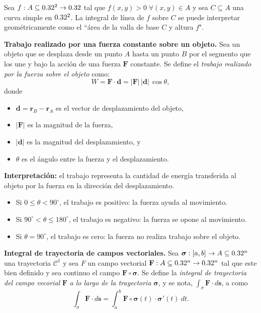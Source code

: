 \begin{obs} 
 Sea $f:A\subseteq0.32^2 \to0.32$   tal que  $f(x,y)>0 \; \forall (x,y) \in A$ y   sea $C  \subseteq  A$  una curva simple en $0.32^2$.   La integral de l\'inea de $f$ sobre $C$  se puede interpretar geom\'etricamente como el ``\'area de la valla de base $C$  y altura $f$". 
\end{obs}


\begin{definition}\textbf{Trabajo realizado por una fuerza constante sobre un objeto.}  
Sea un objeto que se desplaza desde un punto $A$ hasta un punto $B$ por el segmento que los une y  bajo la acci\'on de una fuerza \(\mathbf{F}\) constante. 
Se define el     \emph{trabajo realizado por la fuerza sobre el objeto} como:
\[
W = \mathbf{F} \cdot \mathbf{d} = |\mathbf{F}| \, |\mathbf{d}| \, \cos\theta,
\]
donde
\begin{itemize}
    \item \(\mathbf{d} = \mathbf{r}_B - \mathbf{r}_A\) es el vector de desplazamiento del objeto,
    \item \(|\mathbf{F}|\) es la magnitud de la fuerza,
    \item \(|\mathbf{d}|\) es la magnitud del desplazamiento, y
    \item \(\theta\) es el ángulo entre la fuerza y el desplazamiento.
\end{itemize}
\end{definition}


\textbf{Interpretaci\'on:} el trabajo representa la cantidad de energ\'ia transferida al objeto por la fuerza en la direcci\'on del desplazamiento. 
\begin{itemize}
    \item Si \(0 \leq \theta < 90^\circ\), el trabajo es positivo: la fuerza ayuda al movimiento.
    \item Si \(90^\circ < \theta \leq 180^\circ\), el trabajo es negativo: la fuerza se opone al movimiento.
    \item Si \(\theta = 90^\circ\), el trabajo es cero: la fuerza no realiza trabajo sobre el objeto.
\end{itemize}


\begin{definition}\textbf{Integral de trayectoria de campos vectoriales.} Sea $\boldsymbol{\sigma}:[a,b]\to A\subseteq0.32^n$ una trayectoria $\mathcal{C}^1$  y sea $F$ un campo vectorial   $\mathbf{F}:A\subseteq0.32^n\to0.32^n$   tal que este bien definido y sea continuo el campo $\mathbf{F}\circ\boldsymbol{\sigma}$. Se define la \emph{integral de trayectoria del campo vecorial} $\mathbf{F}$ \emph{a lo largo de la trayectoria} $\boldsymbol{\sigma}$, y se nota, $ \int_{\sigma}\mathbf{F}\cdot d\mathbf{s}$, a como
    \[
        \int_{\sigma}\mathbf{F}\cdot d\mathbf{s}=\int_a^b\mathbf{F}\circ\boldsymbol{\sigma}(t)\cdot\boldsymbol{\sigma}'(t)\:dt. 
    \]
\end{definition}

